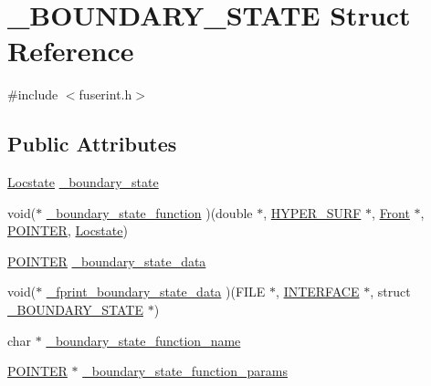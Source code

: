 \hypertarget{struct___b_o_u_n_d_a_r_y___s_t_a_t_e}{}\section{\+\_\+\+B\+O\+U\+N\+D\+A\+R\+Y\+\_\+\+S\+T\+A\+TE Struct Reference}
\label{struct___b_o_u_n_d_a_r_y___s_t_a_t_e}


{\ttfamily \#include $<$fuserint.\+h$>$}

\subsection*{Public Attributes}
\begin{DoxyCompactItemize}
\item 
\hyperlink{fdecs_8h_ace3c795e1cf7a6b6e5444944f0b59bcd}{Locstate} \hyperlink{struct___b_o_u_n_d_a_r_y___s_t_a_t_e_ae24143fc7a2ddcc11efa536e5e06553c}{\+\_\+boundary\+\_\+state}
\item 
void($\ast$ \hyperlink{struct___b_o_u_n_d_a_r_y___s_t_a_t_e_a9f251f5fedd38d33c5cb05dd5561b68a}{\+\_\+boundary\+\_\+state\+\_\+function} )(double $\ast$, \hyperlink{int_8h_acef50fa4757ce0d3f75c97fab5a175bc}{H\+Y\+P\+E\+R\+\_\+\+S\+U\+RF} $\ast$, \hyperlink{fdecs_8h_ac32202b798f848095c489cfd04c4ca5f}{Front} $\ast$, \hyperlink{cdecs_8h_ae51a81000f343b8ec43bca1f6a723d7b}{P\+O\+I\+N\+T\+ER}, \hyperlink{fdecs_8h_ace3c795e1cf7a6b6e5444944f0b59bcd}{Locstate})
\item 
\hyperlink{cdecs_8h_ae51a81000f343b8ec43bca1f6a723d7b}{P\+O\+I\+N\+T\+ER} \hyperlink{struct___b_o_u_n_d_a_r_y___s_t_a_t_e_a105bc37ecf4a4fe3f2caf38baee98b47}{\+\_\+boundary\+\_\+state\+\_\+data}
\item 
void($\ast$ \hyperlink{struct___b_o_u_n_d_a_r_y___s_t_a_t_e_af1b6dda43f3b86c42242f03a5e579290}{\+\_\+fprint\+\_\+boundary\+\_\+state\+\_\+data} )(F\+I\+LE $\ast$, \hyperlink{int_8h_a58cf562d0d320a608294b7310ea167dc}{I\+N\+T\+E\+R\+F\+A\+CE} $\ast$, struct \hyperlink{struct___b_o_u_n_d_a_r_y___s_t_a_t_e}{\+\_\+\+B\+O\+U\+N\+D\+A\+R\+Y\+\_\+\+S\+T\+A\+TE} $\ast$)
\item 
char $\ast$ \hyperlink{struct___b_o_u_n_d_a_r_y___s_t_a_t_e_ad3c110c7a27f9f596dfbb6f8a952c79f}{\+\_\+boundary\+\_\+state\+\_\+function\+\_\+name}
\item 
\hyperlink{cdecs_8h_ae51a81000f343b8ec43bca1f6a723d7b}{P\+O\+I\+N\+T\+ER} $\ast$ \hyperlink{struct___b_o_u_n_d_a_r_y___s_t_a_t_e_a06f1ac10c11a81b4e299fb4d513d01ce}{\+\_\+boundary\+\_\+state\+\_\+function\+\_\+params}
\end{DoxyCompactItemize}


